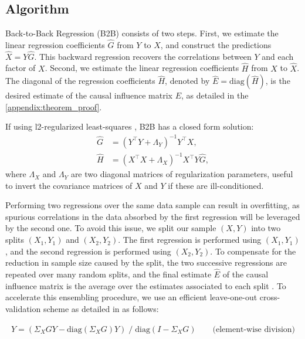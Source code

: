 \documentclass[preprint,12pt,3p]{elsarticle}
\begin{document}
\subsection{Algorithm}

Back-to-Back Regression (B2B) consists of two steps.
%
First, we estimate the linear regression coefficients $\hat G$ from $Y$ to $X$,
and construct the predictions $\hat X = Y \hat G$.
%
This backward regression recovers the correlations between $Y$ and each factor
of $X$.
%
Second, we estimate the linear regression coefficients $\hat H$ from $X$ to
$\hat X$.
%
The diagonal of the regression coefficients $\hat H$, denoted by $\hat{E} =
\text{diag}(\hat{H})$, is the desired estimate of the causal influence matrix
$E$, as detailed in the \ref{appendix:theorem_proof}.

If using l2-regularized least-squares \citep{hoerl1959optimum, rifkin2007notes},
B2B has a closed form solution:
\begin{align}
    \hat G &= (Y^\top Y + \Lambda_Y)^{-1} Y^\top X,\label{eq:solG}\\
    \hat H &=(X^\top X + \Lambda_X)^{-1} X^\top Y \hat G,\label{eq:solH}
\end{align}
%
where $\Lambda_X$ and $\Lambda_Y$ are two diagonal matrices of regularization
parameters, useful to invert the covariance matrices of $X$ and $Y$ if these are
ill-conditioned.

Performing two regressions over the same data sample can result in overfitting,
as spurious correlations in the data absorbed by the first regression will be
leveraged by the second one.
%
To avoid this issue, we split our sample $(X, Y)$ into two splits $(X_1, Y_1)$
and $(X_2, Y_2)$.
%
The first regression is performed using $(X_1, Y_1)$, and the second
regression is performed using $(X_2, Y_2)$.
%
To compensate for the reduction in sample size caused by the split, the two
successive regressions are
repeated over many random splits, and the final estimate $\hat E$ of the causal
influence matrix is the average over the estimates associated to each split
\citep{breiman1996bagging}.
%
To accelerate this ensembling procedure, we use an efficient
leave-one-out cross-validation scheme as detailed in \citep{rifkin2007notes}
as follows:
%

\begin{equation}
\hat{Y} = (\Sigma_X G Y - \text{diag}(\Sigma_X G) Y) \;/\; \text{diag}(I - \Sigma_X G) \qquad \text{(element-wise division)}
\end{equation}
\end{document}

